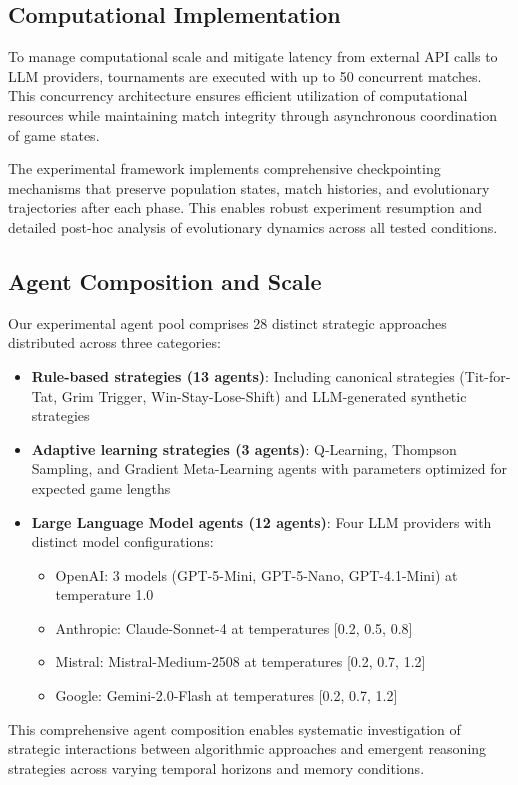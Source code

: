 \subsection{Computational Implementation}

To manage computational scale and mitigate latency from external API calls to LLM providers, tournaments are executed with up to 50 concurrent matches. This concurrency architecture ensures efficient utilization of computational resources while maintaining match integrity through asynchronous coordination of game states.

The experimental framework implements comprehensive checkpointing mechanisms that preserve population states, match histories, and evolutionary trajectories after each phase. This enables robust experiment resumption and detailed post-hoc analysis of evolutionary dynamics across all tested conditions.

\subsection{Agent Composition and Scale}

Our experimental agent pool comprises 28 distinct strategic approaches distributed across three categories:
\begin{itemize}
    \item \textbf{Rule-based strategies (13 agents)}: Including canonical strategies (Tit-for-Tat, Grim Trigger, Win-Stay-Lose-Shift) and LLM-generated synthetic strategies
    \item \textbf{Adaptive learning strategies (3 agents)}: Q-Learning, Thompson Sampling, and Gradient Meta-Learning agents with parameters optimized for expected game lengths
    \item \textbf{Large Language Model agents (12 agents)}: Four LLM providers with distinct model configurations:
    \begin{itemize}
        \item OpenAI: 3 models (GPT-5-Mini, GPT-5-Nano, GPT-4.1-Mini) at temperature 1.0
        \item Anthropic: Claude-Sonnet-4 at temperatures [0.2, 0.5, 0.8]
        \item Mistral: Mistral-Medium-2508 at temperatures [0.2, 0.7, 1.2]
        \item Google: Gemini-2.0-Flash at temperatures [0.2, 0.7, 1.2]
    \end{itemize}
\end{itemize}

This comprehensive agent composition enables systematic investigation of strategic interactions between algorithmic approaches and emergent reasoning strategies across varying temporal horizons and memory conditions.